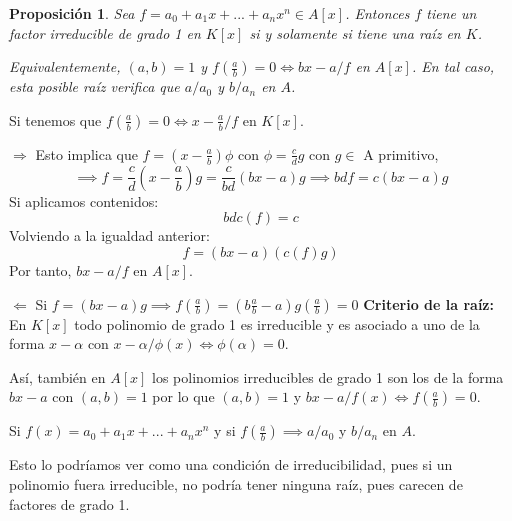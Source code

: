 \documentclass[11pt, a4paper, titlepage]{article}
\makeatletter
\newif\IfInSansMode
\let\oldsf\sffamily
\renewcommand*{\sffamily}{\oldsf\mathversion{sans}\InSansModetrue}
\let\oldnorm\normalfont
\renewcommand*{\normalfont}{\oldnorm\InSansModefalse\mathversion{normal}}
\renewenvironment{proof}[1][\proofname] {\vspace{-15pt}\par\pushQED{\qed}\normalfont\topsep6\p@\@plus6\p@\relax\trivlist\item[\hskip\labelsep\it#1\@addpunct{.}]\ignorespaces}{\popQED\endtrivlist\@endpefalse}
\renewenvironment{proof}[1][\proofname] {\par\pushQED{\qed}\normalfont\topsep6\p@\@plus6\p@\relax\trivlist\item[\hskip\labelsep\itshape\sffamily#1\@addpunct{.}]\ignorespaces}{\popQED\endtrivlist\@endpefalse}
\theoremstyle{theorem-style}
\newtheorem{nprop}{Proposición}[section]
\theoremstyle{definition-style}
\theoremstyle{remark-style}
\theoremstyle{example-style}
\makeatother
\begin{document}
\begin{nprop}
	Sea $f=a_0+a_1x+...+a_nx^n \in A[x]$. Entonces $f$ tiene un factor irreducible de grado 1 en $K[x]$ si y solamente si tiene una raíz en $K$.

	Equivalentemente, $(a,b)=1$ y $f(\frac{a}{b})=0 \iff bx-a/f$ en $A[x]$. En tal caso, esta posible raíz verifica que $a/a_0$ y $b/a_n$ en $A$.
\end{nprop}
\begin{proof}
	Si tenemos que $f(\frac{a}{b})=0 \iff x-\frac{a}{b}/f$ en $K[x]$.

	$\boxed{\Rightarrow}$ Esto implica que $f=(x-\frac{a}{b})\phi$ con $\phi=\frac{c}{d}g$ con $g \in$ A primitivo, $$\implies f= \frac{c}{d}(x-\frac{a}{b})g = \frac{c}{bd}(bx-a)g \implies bdf=c(bx-a)g$$
	Si aplicamos contenidos:
	\[
	bdc(f)=c
	\]
	Volviendo a la igualdad anterior:
	\[
	f=(bx-a)(c(f)g)
	\]
	Por tanto, $bx-a/f$ en $A[x]$.

	$\boxed{\Leftarrow}$ Si $f=(bx-a)g \implies f(\frac{a}{b}) = (b\frac{a}{b}-a)g(\frac{a}{b})=0$
\end{proof}
\textbf{Criterio de la raíz:}
En $K[x]$ todo polinomio de grado 1 es irreducible y es asociado a uno de la forma $x-\alpha$ con $x-\alpha/\phi(x)\iff \phi(\alpha) = 0$.

Así, también en $A[x]$ los polinomios irreducibles de grado 1 son los de la forma $bx-a$ con $(a,b)=1$ por lo que $(a,b)=1$ y $bx-a/f(x)\iff f(\frac{a}{b})= 0$.

Si $f(x)= a_0+a_1x+...+a_nx^n$ y si $f(\frac{a}{b}) \implies a / a_0$ y $b/a_n$ en $A$.

Esto lo podríamos ver como una condición de irreducibilidad, pues si un polinomio fuera irreducible, no podría tener ninguna raíz, pues carecen de factores de grado 1.
\end{document}
